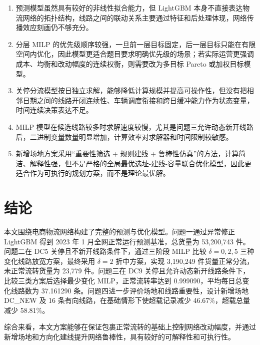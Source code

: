 \documentclass[UTF8,zihao=-4,a4paper,fontset=fandol]{ctexart}
\begin{document}
\begin{enumerate}

\item 预测模型虽然具有较好的非线性拟合能力，但 LightGBM 本身不直接表达物流网络的拓扑结构，线路之间的联动关系主要通过特征和后处理体现，网络传播效应刻画仍不够充分。

\item 分层 MILP 的优先级顺序较强，一旦前一层目标固定，后一层目标只能在有限空间内优化，因此模型更适合题目要求明确优先级的场景；若实际运营更强调成本、均衡和改动幅度的连续权衡，则需要改为多目标 Pareto 或加权目标模型。

\item 关停分流模型按日独立求解，能够降低计算规模并提高可操作性，但没有把相邻日期之间的线路开闭连续性、车辆调度衔接和跨日缓冲能力作为状态变量，时间连续决策表达不足。

\item MILP 模型在候选线路较多时求解速度较慢，尤其是问题三允许动态新开线路后，二进制变量数量明显增加，计算效率对求解器和时间限制较敏感。

\item 新增场地方案采用“重要性筛选 + 规则建线 + 鲁棒性仿真”的方法，计算简洁、解释性强，但不是严格的全局最优选址-建线-容量联合优化模型，因此更适合作为可执行的规划方案，而不是理论最优解。

\end{enumerate}



\section{结论}



本文围绕电商物流网络构建了完整的预测与优化模型。问题一通过异常修正 LightGBM 得到 2023 年 1 月全网正常运行预测基准，总货量为 53,200,743 件。问题二在 DC5 关停且不新开线路条件下，通过三阶段 MILP 比较 $\delta=0,2,5$ 三种变化线路放宽方案，最终采用 $\delta=2$ 折中方案，实现 3,190,249 件货量正常分流，未正常流转货量为 23,779 件。问题三在 DC9 关停且允许动态新开线路条件下，比较三类方案后选择最少变化 MILP，正常流转率达到 0.999090，平均每日总变化线路数为 37.161290 条。问题四进一步评价场地和线路重要性，设计新增场地 DC\_NEW 及 16 条有向线路，在基础情形下使超载记录减少 46.67\%，超载总量减少 58.81\%。



综合来看，本文方案能够在保证包裹正常流转的基础上控制网络改动幅度，并通过新增场地和方向化建线提升网络鲁棒性，具有较好的可解释性和可执行性。
\end{document}

